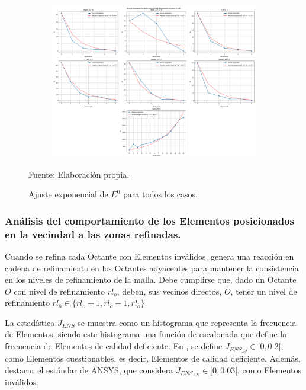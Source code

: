 \begin{itemize}
	\begin{figure}[!ht]
		\centering
		\begin{subfigure}[t]{1.0\textwidth}
			\includegraphics[width=0.75\paperheight, angle=90, origin=c]{figures/analysis/fit_all.png}
		\end{subfigure}
		\caption{ Ajuste exponencial de $E^0$ para todos los casos. }
		Fuente: Elaboración propia.
		\label{fig:exponential_fit_all}
	\end{figure}

\end{itemize}


\subsubsection{ Análisis del comportamiento de los Elementos posicionados en la vecindad a las zonas refinadas.}

Cuando se refina cada Octante con Elementos inválidos, genera una reacción en cadena de refinamiento en los Octantes adyacentes para mantener la consistencia en los niveles de refinamiento de la malla. Debe cumplirse que, dado un Octante $O$ con nivel de refinamiento $rl_o$, deben, sus vecinos directos, $\bar{O}$, tener un nivel de refinamiento $rl_{\bar{o}} \in \{rl_o + 1, rl_o - 1, rl_o\}$.



La estadística $J_{ENS}$ se muestra como un histograma que representa la frecuencia de Elementos, siendo este histograma una función de escalonada que define la frecuencia de Elementos de calidad deficiente. En \cite{shepherd-2008}, se define $J_{ENS_{SJ}} \in [0, 0.2[$, como Elementos cuestionables, es decir, Elementos de calidad deficiente. Además, destacar el estándar de ANSYS, que considera $J_{ENS_{AN}} \in [0, 0.03[$, como Elementos inválidos.

